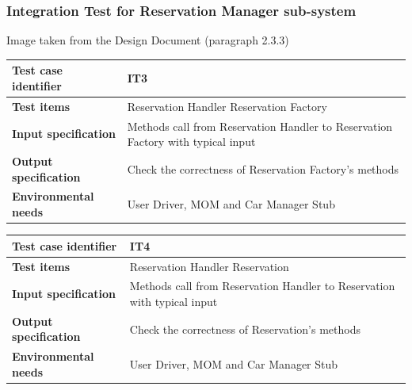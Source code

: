 \documentclass{article}
\begin{document}
			\subsubsection{Integration Test for Reservation Manager sub-system} \label{sec:3.1.2}
				\begin{minipage}{\linewidth}
				\end{minipage}
				\begin{center}
					Image taken from the Design Document (paragraph 2.3.3)
				\end{center}
				\begin{center}
					\setlength{\tabcolsep}{24pt}
					\renewcommand{\arraystretch}{1.4}
					\begin{tabular}{ | l | p{8cm} |}\hline
						\textbf{Test case identifier} & IT3\\\hline
						\textbf{Test items} & Reservation Handler \textrightarrow Reservation Factory\\\hline
						\textbf{Input specification} &  Methods call from Reservation Handler to Reservation Factory with typical input \\\hline
						\textbf{Output specification} & Check the correctness of Reservation Factory's methods \\\hline
						\textbf{Environmental needs} & User Driver, MOM and Car Manager Stub \\\hline
					\end{tabular}
				\end{center}	
				\bigskip
				\begin{center}
					\setlength{\tabcolsep}{24pt}
					\renewcommand{\arraystretch}{1.4}
					\begin{tabular}{ | l | p{8cm} |}\hline
						\textbf{Test case identifier} & IT4\\\hline
						\textbf{Test items} & Reservation Handler \textrightarrow Reservation\\\hline
						\textbf{Input specification} & Methods call from Reservation Handler to Reservation with typical input \\\hline
						\textbf{Output specification} & Check the correctness of Reservation's methods \\\hline
						\textbf{Environmental needs} & User Driver, MOM and Car Manager Stub \\\hline
					\end{tabular}
				\end{center}
				\pagebreak
\end{document}
